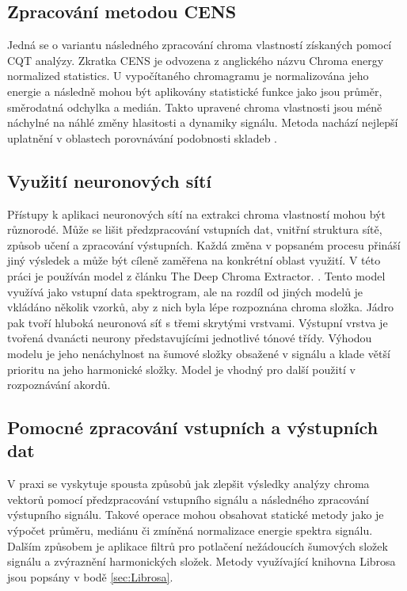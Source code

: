   \subsection{Zpracování metodou CENS}
  Jedná se o variantu následného zpracování chroma vlastností získaných pomocí \acs{CQT} analýzy. Zkratka \acs {CENS} je odvozena z anglického názvu Chroma energy normalized statistics. U vypočítaného chromagramu je normalizována jeho energie a následně mohou být aplikovány statistické funkce jako jsou průměr, směrodatná odchylka a medián. Takto upravené chroma vlastnosti jsou méně náchylné na náhlé změny hlasitosti a dynamiky signálu. Metoda nachází nejlepší uplatnění v oblastech porovnávání podobnosti skladeb \cite{MuellerEwert11_ChromaToolbox_ISMIR}. 

  \subsection{Využití neuronových sítí}
  Přístupy k aplikaci neuronových sítí na extrakci chroma vlastností mohou být různorodé. Může se lišit předzpracování vstupních dat, vnitřní struktura sítě, způsob učení a zpracování výstupních. Každá změna v popsaném procesu přináší jiný výsledek a může být cíleně zaměřena na konkrétní oblast využití. V této práci je používán model z článku The Deep Chroma Extractor. \cite{The_deep_chroma_extractor}. Tento model využívá jako vstupní data spektrogram, ale na rozdíl od jiných modelů je vkládáno několik vzorků, aby z nich byla lépe rozpoznána chroma složka. Jádro pak tvoří hluboká neuronová síť s třemi skrytými vrstvami. Výstupní vrstva je tvořená dvanácti neurony představujícími jednotlivé tónové třídy. Výhodou modelu je jeho nenáchylnost na šumové složky obsažené v signálu a klade větší prioritu na jeho harmonické složky. Model je vhodný pro další použití v rozpoznávání akordů. 

  \subsection{Pomocné zpracování vstupních a výstupních dat}
  V praxi se vyskytuje spousta způsobů jak zlepšit výsledky analýzy chroma vektorů pomocí předzpracování vstupního signálu a následného zpracování výstupního signálu. Takové operace mohou obsahovat statické metody jako je výpočet průměru, mediánu či zmíněná normalizace energie spektra signálu. Dalším způsobem je aplikace filtrů pro potlačení nežádoucích šumových složek signálu a zvýraznění harmonických složek. Metody využívající knihovna Librosa jsou popsány v bodě \ref{sec:Librosa}.

